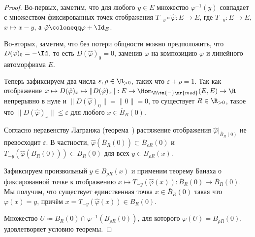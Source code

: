 \documentclass[
	extrafontsizes,
	11pt,
	hyphens,
]{memoir}
\begin{document}
\begin{proof}
Во-первых, заметим, что для любого \(y \in E\) множество \(\varphi^{-1}(y)\) совпадает с множеством фиксированных точек отображения \(T_{-y} \circ \hat{\varphi} : E \to E\), где \(T_{-y} : E \to E\), \(x \mapsto x - y\), а \(\hat{\varphi} \coloneqq \varphi + \Id_E\).

Во-вторых, заметим, что без потери общности можно предположить, что \(D(\varphi)_0 = -\Id\), то есть \(D(\hat{\varphi})_0 = 0\), заменив \(\varphi\) на композицию \(\varphi\) и линейного автоморфизма \(E\).

Теперь зафиксируем два числа
\(\varepsilon, \rho \in \R_{>0}\), таких что \(\varepsilon + \rho = 1\).
Так как отображение
\(x \mapsto D(\hat{\varphi})_x \mapsto \lVert D(\hat{\varphi})_x \rVert : E \to \Hom_{\R\tn{-}\mr{mod}}(E,E) \to \R\)
непрерывно в нуле
и \(\lVert D(\hat{\varphi})_0 \rVert = \lVert 0 \rVert = 0\),
то существует \(R \in \R_{>0}\), такое что
\(\lVert D(\hat{\varphi})_x \rVert \leq \varepsilon\)
для любого \(x \in \overline{B}_R(0)\).

Согласно неравенству Лагранжа (теорема~)
растяжение отображения \(\hat{\varphi}|_{\overline{B}_R(0)}\)
не превосходит \(\varepsilon\).
В частности, \(\hat{\varphi}(\overline{B}_R(0)) \subset \overline{B}_{\varepsilon R}(0)\)
и \(T_{-y} (\hat{\varphi} (\overline{B}_R(0))) \subset B_R(0)\)
для всех \(y \in B_{\rho R}(x)\).

Зафиксируем произвольный \(y \in B_{\rho R}(x)\) и применим теорему Банаха о фиксированной точке к
отображению \(x \mapsto T_{-y}(\hat{\varphi}(x)) : \overline{B}_R(0) \to \overline{B}_R(0)\).
Мы получим, что существует единственная точка \(x \in \overline{B}_R(0)\) такая что \(\varphi(x) = y\),
причём \(x = T_{-y}(\hat{\varphi}(x)) \in B_R(0)\).

Множество
\(U \coloneqq B_R(0) \cap \varphi^{-1}(B_{\rho R}(0))\),
для которого \(\varphi(U) = B_{\rho R}(0)\),
удовлетворяет условию теоремы.
\end{proof}
\end{document}
